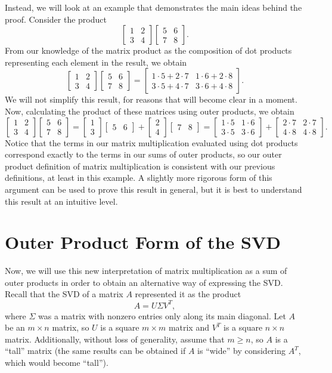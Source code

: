 \documentclass[letterpaper]{article}
\theoremstyle{remark}
\newcommand{\mat}[1]{\ensuremath{\begin{bmatrix}#1\end{bmatrix}}}
\begin{document}
Instead, we will look at an example that demonstrates the main ideas behind the proof. Consider the product
\[
    \mat{1 & 2 \\ 3 & 4} \mat{5 & 6 \\ 7 & 8}.
\]
From our knowledge of the matrix product as the composition of dot products representing each element in the result, we obtain
\[
    \mat{1 & 2 \\ 3 & 4} \mat{5 & 6 \\ 7 & 8} = \mat{1\cdot 5 + 2 \cdot 7 & 1 \cdot 6 + 2\cdot 8 \\ 3 \cdot 5 + 4 \cdot 7 & 3 \cdot 6 + 4 \cdot 8}.
\]
We will not simplify this result, for reasons that will become clear in a moment. Now, calculating the product of these matrices using outer products, we obtain
\[
    \mat{1 & 2 \\ 3 & 4} \mat{5 & 6 \\ 7 & 8} = \mat{1 \\ 3}\mat{5 & 6} + \mat{2 \\ 4} \mat{7 & 8} = \mat{1\cdot 5 & 1\cdot 6 \\ 3 \cdot 5 & 3 \cdot 6} + \mat{2\cdot 7 & 2\cdot 7 \\ 4\cdot 8 & 4 \cdot 8}.
\]
Notice that the terms in our matrix multiplication evaluated using dot products correspond exactly to the terms in our sums of outer products, so our outer product definition of matrix multiplication is consistent with our previous definitions, at least in this example. A slightly more rigorous form of this argument can be used to prove this result in general, but it is best to understand this result at an intuitive level.

\section{Outer Product Form of the SVD}
Now, we will use this new interpretation of matrix multiplication as a sum of outer products in order to obtain an alternative way of expressing the SVD. Recall that the SVD of a matrix $A$ represented it as the product
\[
    A = U\Sigma V^T,
\]
where $\Sigma$ was a matrix with nonzero entries only along its main diagonal. Let $A$ be an $m \times n$ matrix, so $U$ is a square $m\times m$ matrix and $V^T$ is a square $n \times n$ matrix. Additionally, without loss of generality, assume that $m \ge n$, so $A$ is a ``tall'' matrix (the same results can be obtained if $A$ is ``wide'' by considering $A^T$, which would become ``tall'').
\end{document}
